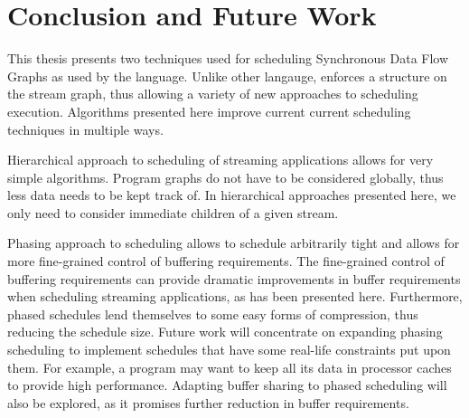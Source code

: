 \section{Conclusion and Future Work}

This thesis presents two techniques used for scheduling
Synchronous Data Flow Graphs as used by the {\StreamIt} language.
Unlike other langauge, {\StreamIt} enforces a structure on the
stream graph, thus allowing a variety of new approaches to
scheduling execution. Algorithms presented here improve current
current scheduling techniques in multiple ways.

Hierarchical approach to scheduling of streaming applications
allows for very simple algorithms. Program graphs do not have to
be considered globally, thus less data needs to be kept track of.
In hierarchical approaches presented here, we only need to
consider immediate children of a given stream.

Phasing approach to scheduling allows to schedule arbitrarily
tight {{\feedbackloops}} and allows for more fine-grained control of
buffering requirements. The fine-grained control of buffering
requirements can provide dramatic improvements in buffer
requirements when scheduling streaming applications, as has been
presented here. Furthermore, phased schedules lend themselves to
some easy forms of compression, thus reducing the schedule size.
Future work will concentrate on expanding phasing scheduling to
implement schedules that have some real-life constraints put upon
them. For example, a program may want to keep all its data in
processor caches to provide high performance. Adapting buffer
sharing to phased scheduling will also be explored, as it promises
further reduction in buffer requirements.
